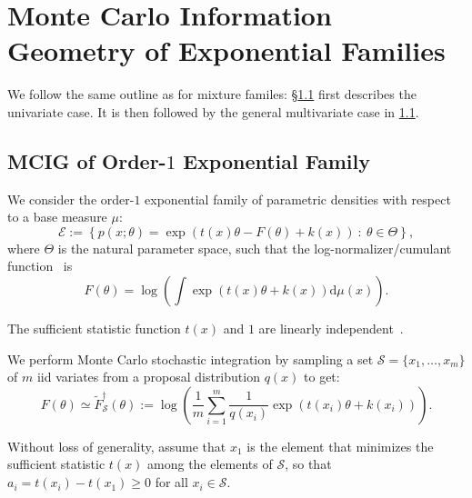 \documentclass[graybox]{svmult}
\def\dmu{\mathrm{d}\mu}
\def\eqdef{:=}
\def\tildeF{\tilde{F}}
\def\calS{\mathcal{S}}
\def\calE{\mathcal{E}}
\def\st{{\ :\ }}
\begin{document}
\section{Monte Carlo Information Geometry of Exponential Families}\label{sec:MCIGEF}

We follow the same outline as for mixture familes: \S\ref{sec:MCIGEF1D} first describes the univariate case.
It is then followed by the general multivariate case in  \ref{sec:MCIGEF1D}.

\subsection{MCIG of Order-$1$ Exponential Family}\label{sec:MCIGEF1D}
We consider the order-$1$ exponential family of parametric densities with respect to a base measure $\mu$:
\begin{equation}
\calE \eqdef \left\{p(x;\theta)=\exp(t(x)\theta-F(\theta)+k(x)) \st \theta\in\Theta \right\},
\end{equation}
where $\Theta$ is the natural parameter space, such that the log-normalizer/cumulant function~\cite{IG-2016} is
\begin{equation}
F(\theta)=\log\left(\int \exp(t(x)\theta+k(x))\dmu(x)\right).
\end{equation}

The sufficient statistic function $t(x)$ and $1$ are linearly independent~\cite{IG-2014}.


We perform Monte Carlo stochastic integration by sampling a set $\calS=\{x_1,\ldots, x_m\}$ of $m$ iid  variates from a proposal distribution $q(x)$ to get:
\begin{equation}\label{eq:fdagger}
F(\theta) \simeq \tildeF_\calS^\dagger(\theta) \eqdef \log \left( \frac{1}{m} \sum_{i=1}^m \frac{1}{q(x_i)} \exp(t(x_i)\theta+k(x_i)) \right).
\end{equation}

Without loss of generality, assume that $x_1$ is the element that minimizes the sufficient statistic $t(x)$ among the elements of $\calS$, so that
$a_i=t(x_i)-t(x_1)\geq 0$ for all $x_i\in\calS$.
\end{document}
